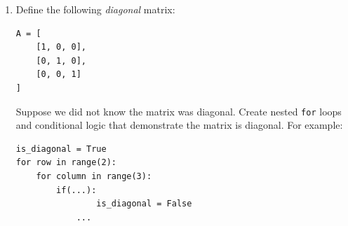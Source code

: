 \documentclass{article}
\begin{document}
\begin{enumerate}

\item Define the following \textit{diagonal} matrix:

\begin{verbatim}
A = [
    [1, 0, 0],
    [0, 1, 0],
    [0, 0, 1]
]
\end{verbatim}

Suppose we did not know the matrix was diagonal.  Create nested \verb+for+ loops and conditional logic that demonstrate the matrix is diagonal.  For example:

\begin{verbatim}
is_diagonal = True
for row in range(2):
    for column in range(3):
        if(...):
        		is_diagonal = False
        	...
\end{verbatim}
\end{enumerate}
\end{document}
